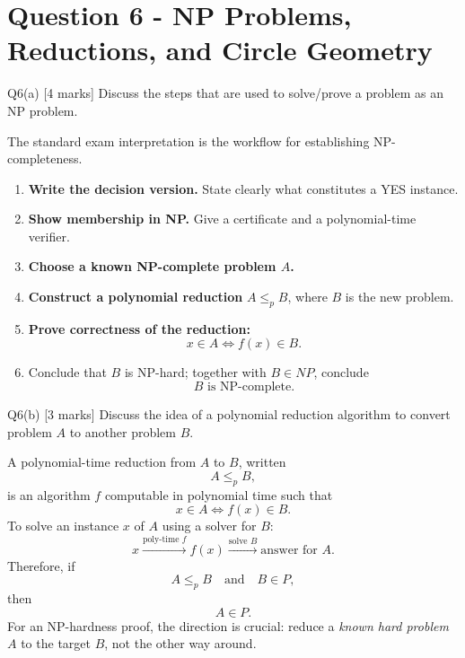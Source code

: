 \documentclass[10.5pt,a4paper]{article}
\begin{document}
\section{Question 6 - NP Problems, Reductions, and Circle Geometry}

\begin{questionbox}{Q6(a) [4 marks]}
Discuss the steps that are used to solve/prove a problem as an NP problem.
\end{questionbox}

\begin{answerbox}
The standard exam interpretation is the workflow for establishing NP-completeness.

\begin{enumerate}
\item \textbf{Write the decision version.} State clearly what constitutes a YES instance.
\item \textbf{Show membership in NP.} Give a certificate and a polynomial-time verifier.
\item \textbf{Choose a known NP-complete problem $A$.}
\item \textbf{Construct a polynomial reduction} $A\le_p B$, where $B$ is the new problem.
\item \textbf{Prove correctness of the reduction:}
\[
x\in A\iff f(x)\in B.
\]
\item Conclude that $B$ is NP-hard; together with $B\in NP$, conclude
\[
\boxed{B\text{ is NP-complete}.}
\]
\end{enumerate}
\end{answerbox}

\begin{questionbox}{Q6(b) [3 marks]}
Discuss the idea of a polynomial reduction algorithm to convert problem $A$ to another problem $B$.
\end{questionbox}

\begin{answerbox}
A polynomial-time reduction from $A$ to $B$, written
\[
A\le_p B,
\]
is an algorithm $f$ computable in polynomial time such that
\[
\boxed{x\in A\iff f(x)\in B.}
\]
To solve an instance $x$ of $A$ using a solver for $B$:
\[
\boxed{x\xrightarrow{\text{poly-time }f}f(x)\xrightarrow{\text{solve }B}\text{answer for }A.}
\]
Therefore, if
\[
A\le_p B
\quad\text{and}\quad
B\in P,
\]
then
\[
\boxed{A\in P.}
\]
For an NP-hardness proof, the direction is crucial: reduce a \emph{known hard problem} $A$ to the target $B$, not the other way around.
\end{answerbox}
\end{document}

